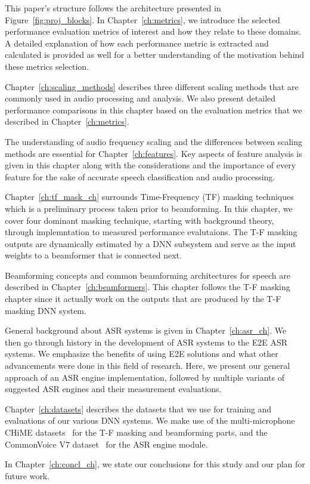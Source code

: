 This paper's structure follows the architecture
presented in Figure~\ref{fig:proj_blocks}.
In Chapter~\ref{ch:metrics}, 
we introduce the selected performance evaluation metrics
of interest and how they relate to these domains. 
A detailed explanation of how each performance metric is
extracted and calculated is provided as well
for a better understanding of the motivation behind
these metrics selection.

Chapter~\ref{ch:scaling_methods} describes three different scaling methods
that are commonly used in audio processing and analysis.
We also present detailed performance comparisons in this chapter based on
the evaluation metrics that we described in Chapter~\ref{ch:metrics}.

The understanding of audio frequency scaling and 
the differences between scaling methods
are essential for Chapter~\ref{ch:features}. 
Key aspects of feature analysis is given in this chapter along with
the considerations and the importance of every feature
for the sake of accurate speech classification and audio processing. 

Chapter~\ref{ch:tf_mask_ch} surrounds Time-Frequency (TF) 
masking techniques which is a preliminary process taken prior
to beamforming. 
In this chapter, we cover four
dominant masking technique, starting with background theory,
through implemntation to measured performance evalutaions.
The T-F masking outputs are dynamically estimated
by a DNN subsystem 
and serve as the input weights
to a beamformer that is connected next.

Beamforming concepts and 
common beamforming architectures for speech
are described in Chapter~\ref{ch:beamformers}.
This chapter follows the T-F masking chapter
since it actually work on the outputs that are produced
by the T-F masking DNN system.

General background about 
ASR systems is given in
Chapter~\ref{ch:asr_ch}.
We then go through history in the development
of ASR systems to the E2E ASR systems.
We emphasize the benefits of using E2E solutions
and what other advancements were done in this field of research.
Here, we present our general approach of an ASR engine implementation,
followed by multiple variants of 
suggested ASR engines and their measurement evaluations.

Chapter~\ref{ch:datasets} describes the datasets that
we use for training and evaluations of our various
DNN systems. We make use of the multi-microphone CHiME datasets~\cite{chime3DS}
for the T-F masking and beamforming parts, 
and the CommonVoice V7 dataset~\cite{commonVoiceDS}
for the ASR engine module.

In Chapter~\ref{ch:concl_ch}, we state our conclusions for this study
and our plan for future work.